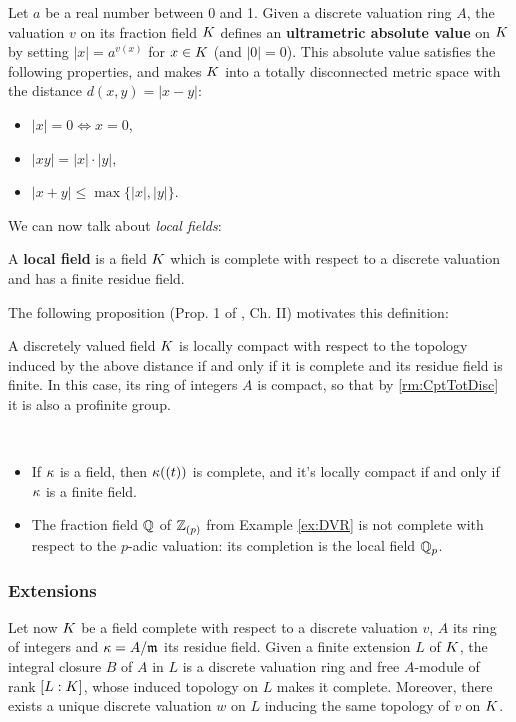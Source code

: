 \documentclass[a4paper, oneside]{memoir}
\begin{document}
Let $a$ be a real number between 0 and 1. Given a discrete valuation ring $A$, the valuation $v$ on its fraction field $K$ defines an \textbf{ultrametric absolute value} on $K$ by setting $|x|=a^{v(x)}$ for $x\in K$ (and
$|0|=0$). This absolute value satisfies the following properties, and makes $K$ into a totally disconnected metric space with the distance $d(x,y)=|x-y|$:
\begin{itemize}
	\item $|x|=0 \iff x=0$,
	\item $|xy|=|x|\cdot|y|$,
	\item $|x+y|\leq\max\{|x|,|y|\}$.
\end{itemize}

We can now talk about \textit{local fields}:

\begin{definition}
	A \textbf{local field} is a field $K$ which is complete with respect to a discrete valuation and has a finite residue field.
\end{definition}

The following proposition (Prop. 1 of \cite{SerreCL}, Ch. II)
motivates this definition:
\begin{proposition}
	A discretely valued field $K$ is locally compact with respect to the topology induced by the above distance if and only if it is complete and its residue field is finite. In
	this case, its ring of integers $A$ is compact, so that by \ref{rm:CptTotDisc} it is also a profinite group.
\end{proposition}

\begin{example}\
	\begin{itemize}
		\item If $\kappa$ is a field, then $\kappa((t))$ is complete, and it's locally compact if and only if $\kappa$ is a finite field.
		\item The fraction field $\mathbb{Q}$ of $\mathbb{Z}_{(p)}$ from Example \ref{ex:DVR} is not complete with respect to the $p$-adic valuation: its completion is the local field $\mathbb{Q}_p$.
	\end{itemize}
\end{example}

\subsubsection{Extensions}

Let now $K$ be a field complete with respect to a discrete valuation $v$, $A$ its ring of integers and $\kappa=A/\mathfrak{m}$ its residue field. Given a finite extension $L$ of $K$, the integral closure $B$ of $A$ in $L$ is a discrete valuation ring and free $A$-module of rank $[L:K]$, whose induced
topology on $L$ makes it complete. Moreover, there exists a unique discrete valuation $w$ on $L$ inducing the same topology of $v$ on $K$.
\end{document}
